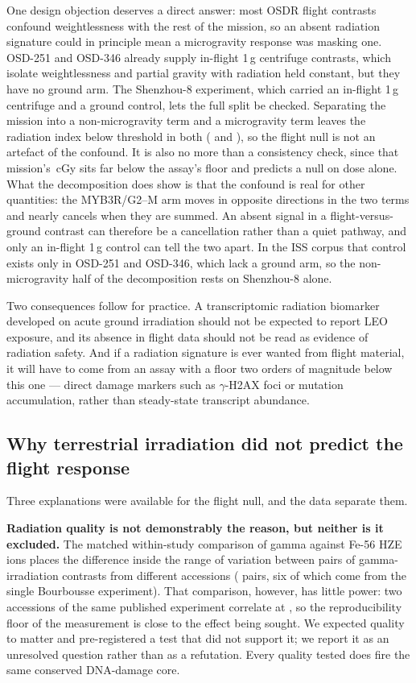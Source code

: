 One design objection deserves a direct answer: most OSDR flight contrasts confound
weightlessness with the rest of the mission, so an absent radiation signature could in
principle mean a microgravity response was masking one. OSD-251 and OSD-346 already supply
in-flight 1\,g centrifuge contrasts, which isolate weightlessness and partial gravity with
radiation held constant, but they have no ground arm. The Shenzhou-8 experiment, which
carried an in-flight 1\,g centrifuge and a ground control, lets the full split be checked. Separating the mission into a
non-microgravity term and a microgravity term leaves the radiation index below threshold in
both (\ShenNonUgIndex{} and \ShenUgOnlyIndex{}), so the flight null is not an artefact of
the confound. It is also no more than a consistency check, since that mission's
\ShenDoseCgy{}\,cGy sits far below the assay's floor and predicts a null on dose alone.
What the decomposition does show is that the confound is real for other quantities: the
MYB3R/G2--M arm moves in opposite directions in the two terms and nearly cancels when they
are summed. An absent signal in a flight-versus-ground contrast can therefore be a
cancellation rather than a quiet pathway, and only an in-flight 1\,g control can tell the
two apart. In the ISS corpus that control exists only in OSD-251 and OSD-346, which lack a
ground arm, so the non-microgravity half of the decomposition rests on Shenzhou-8 alone.

Two consequences follow for practice. A transcriptomic radiation biomarker developed on
acute ground irradiation should not be expected to report LEO exposure, and its absence in
flight data should not be read as evidence of radiation safety. And if a radiation
signature is ever wanted from flight material, it will have to come from an assay with a
floor two orders of magnitude below this one --- direct damage markers such as
$\gamma$-H2AX foci or mutation accumulation, rather than steady-state transcript
abundance.

\subsection*{Why terrestrial irradiation did not predict the flight response}

Three explanations were available for the flight null, and the data separate them.

\textbf{Radiation quality is not demonstrably the reason, but neither is it excluded.} The
matched within-study comparison of gamma against Fe-56 HZE ions places the difference
inside the range of variation between pairs of gamma-irradiation contrasts from different
accessions (\BaselineGammaPairs{} pairs, six of which come from the single Bourbousse
experiment).
That comparison, however, has little power: two accessions of the same published
experiment correlate at \SameExperimentRho{}, so the reproducibility floor of the
measurement is close to the effect being sought. We expected quality to matter and
pre-registered a test that did not support it; we report it as an unresolved question
rather than as a refutation. Every quality tested does fire the same conserved DNA-damage
core.

